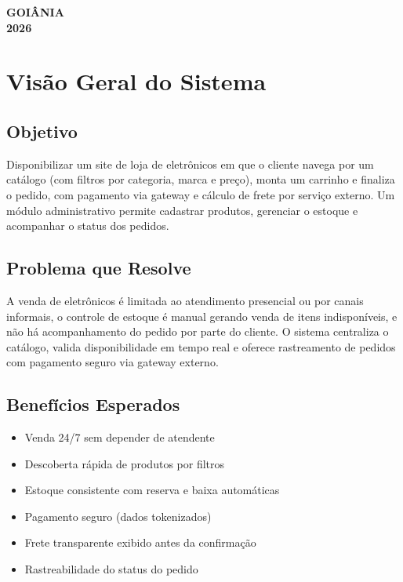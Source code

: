 \documentclass[12pt,a4paper]{article}
\providecommand{\tightlist}{%
  \setlength{\itemsep}{0pt}\setlength{\parskip}{0pt}}
\begin{document}
\vfill
\begin{center}
  \textbf{GOIÂNIA}\\[0.2cm]
  \textbf{2026}
\end{center}
\newpage

\thispagestyle{empty}
\renewcommand{\contentsname}{SUMÁRIO}
\pdfbookmark[0]{\contentsname}{toc}
\tableofcontents
\newpage


\pagestyle{fancy}
\thispagestyle{fancy}

\section{Visão Geral do Sistema}\label{sec:visao-geral}

\subsection{Objetivo}

Disponibilizar um site de loja de eletrônicos em que o cliente navega
por um catálogo (com filtros por categoria, marca e preço), monta um
carrinho e finaliza o pedido, com pagamento via gateway e cálculo de
frete por serviço externo. Um módulo administrativo permite cadastrar
produtos, gerenciar o estoque e acompanhar o status dos pedidos.

\subsection{Problema que Resolve}

A venda de eletrônicos é limitada ao atendimento presencial ou por
canais informais, o controle de estoque é manual gerando venda de itens
indisponíveis, e não há acompanhamento do pedido por parte do cliente.
O sistema centraliza o catálogo, valida disponibilidade em tempo real e
oferece rastreamento de pedidos com pagamento seguro via gateway
externo.

\subsection{Benefícios Esperados}

\begin{itemize}
\tightlist
\item Venda 24/7 sem depender de atendente
\item Descoberta rápida de produtos por filtros
\item Estoque consistente com reserva e baixa automáticas
\item Pagamento seguro (dados tokenizados)
\item Frete transparente exibido antes da confirmação
\item Rastreabilidade do status do pedido
\end{itemize}
\end{document}
